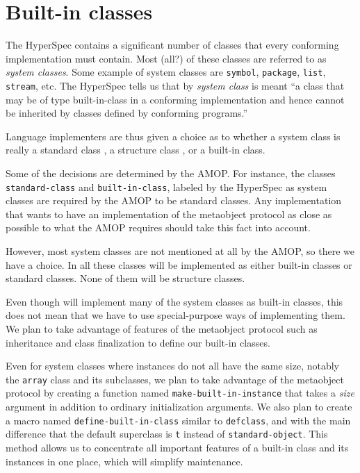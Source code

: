 \section{Built-in classes}
\label{object-system-built-in-classes}

The HyperSpec contains a significant number of classes that every
conforming implementation must contain.  Most (all?) of these classes
are referred to as \emph{system classes}.  Some example of system
classes are \texttt{symbol}, \texttt{package}, \texttt{list},
\texttt{stream}, etc.  The HyperSpec tells us that by \emph{system
  class} is meant ``a class that may be of type built-in-class in a
conforming implementation and hence cannot be inherited by classes
defined by conforming programs.'' 

Language implementers are thus given a choice as to whether a system
class is really a standard class
, a structure class 
, or a built-in class.  

Some of the decisions are determined by the AMOP.  For instance, the
classes \texttt{standard-class} and \texttt{built-in-class}, labeled
by the HyperSpec as system classes are required by the AMOP to be
standard classes.  Any implementation that wants to have an
implementation of the metaobject protocol as close as possible to what
the AMOP requires should take this fact into account. 

However, most system classes are not mentioned at all by the AMOP, so
there we have a choice.  In \sysname{} all these classes will be
implemented as either built-in classes or standard classes.  None of
them will be structure classes. 

Even though \sysname{} will implement many of the system classes as
built-in classes, this does not mean that we have to use
special-purpose ways of implementing them.  We plan to take advantage
of features of the metaobject protocol such as inheritance and class
finalization to define our built-in classes.  

Even for system classes where instances do not all have the same size,
notably the \texttt{array} class and its subclasses, we plan to take
advantage of the metaobject protocol by creating a function named
\texttt{make-built-in-instance} that takes a \emph{size} argument in
addition to ordinary initialization arguments.  We also plan to create
a macro named \texttt{define-built-in-class} similar to
\texttt{defclass}, and with the main difference that the default
superclass is \texttt{t} instead of \texttt{standard-object}.  This
method allows us to concentrate all important features of a built-in
class and its instances in one place, which will simplify
maintenance. 

